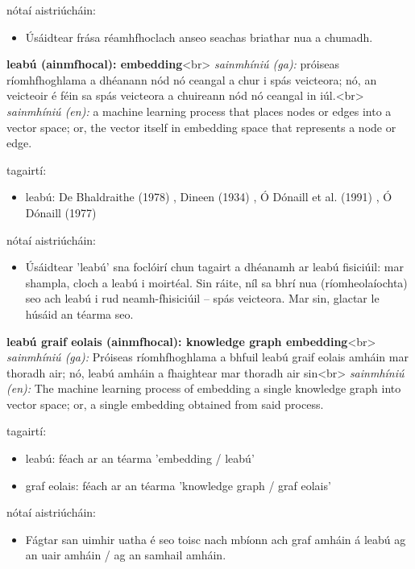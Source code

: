 \documentclass{article}
\begin{document}
nótaí aistriúcháin:
\begin{itemize}
	\item Úsáidtear frása réamhfhoclach anseo seachas briathar nua a chumadh.
\end{itemize}


\textbf{leabú (ainmfhocal): embedding}<br>
\textit{sainmhíniú (ga):} próiseas ríomhfhoghlama a dhéanann nód nó ceangal a chur i spás veicteora; nó, an veicteoir é féin sa spás veicteora a chuireann nód nó ceangal in iúl.<br>
\textit{sainmhíniú (en):} a machine learning process that places nodes or edges into a vector space; or, the vector itself in embedding space that represents a node or edge.

tagairtí:
\begin{itemize}
	\item leabú: De Bhaldraithe (1978) \cite{de-bhaldraithe}, Dineen (1934) \cite{dineen}, Ó Dónaill et al. (1991) \cite{focloir-beag}, Ó Dónaill (1977) \cite{odonaill}
\end{itemize}

nótaí aistriúcháin:
\begin{itemize}
	\item Úsáidtear 'leabú' sna foclóirí chun tagairt a dhéanamh ar leabú fisiciúil: mar shampla, cloch a leabú i moirtéal. Sin ráite, níl sa bhrí nua (ríomheolaíochta) seo ach leabú i rud neamh-fhisiciúil -- spás veicteora. Mar sin, glactar le húsáid an téarma seo.
\end{itemize}


\textbf{leabú graif eolais (ainmfhocal): knowledge graph embedding}<br>
\textit{sainmhíniú (ga):} Próiseas ríomhfhoghlama a bhfuil leabú graif eolais amháin mar thoradh air; nó, leabú amháin a fhaightear mar thoradh air sin<br>
\textit{sainmhíniú (en):} The machine learning process of embedding a single knowledge graph into vector space; or, a single embedding obtained from said process.

tagairtí:
\begin{itemize}
	\item leabú: féach ar an téarma 'embedding / leabú'
	\item graf eolais: féach ar an téarma 'knowledge graph / graf eolais'
\end{itemize}

nótaí aistriúcháin:
\begin{itemize}
	\item Fágtar san uimhir uatha é seo toisc nach mbíonn ach graf amháin á leabú ag an uair amháin / ag an samhail amháin.
\end{itemize}
\end{document}
